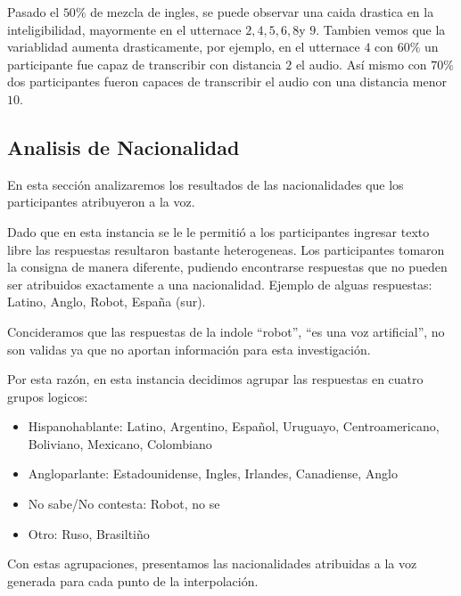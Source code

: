 Pasado el $50\%$ de mezcla de ingles, se puede observar una caida drastica en la inteligibilidad, mayormente en el utternace $2, 4, 5, 6, 8$y $9$. Tambien vemos que la variablidad aumenta drasticamente, por ejemplo, en el utternace $4$ con $60\%$ un participante fue capaz de transcribir con distancia $2$ el audio. Así mismo con $70\%$ dos participantes fueron capaces de transcribir el audio con una distancia menor $10$.


\subsection{Analisis de Nacionalidad}


En esta sección analizaremos los resultados de las nacionalidades que los participantes atribuyeron a la voz.

Dado que en esta instancia se le le permitió a los participantes ingresar texto libre las respuestas resultaron bastante heterogeneas. Los participantes tomaron la consigna de manera diferente, pudiendo encontrarse respuestas que no pueden ser atribuidos exactamente a una nacionalidad. Ejemplo de alguas respuestas: Latino, Anglo, Robot, España (sur).

Concideramos que las respuestas de la indole ``robot'', ``es una voz artificial'', no son validas ya que no aportan información para esta investigación.

Por esta razón, en esta instancia decidimos agrupar las respuestas en cuatro grupos logicos:

\begin{itemize}
	\item Hispanohablante: Latino, Argentino, Español, Uruguayo, Centroamericano, Boliviano, Mexicano, Colombiano
	\item Angloparlante: Estadounidense, Ingles, Irlandes, Canadiense, Anglo
	\item No sabe/No contesta: Robot, no se
	\item Otro: Ruso, Brasiltiño
\end{itemize}

Con estas agrupaciones, presentamos las nacionalidades atribuidas a la voz generada para cada punto de la interpolación.


